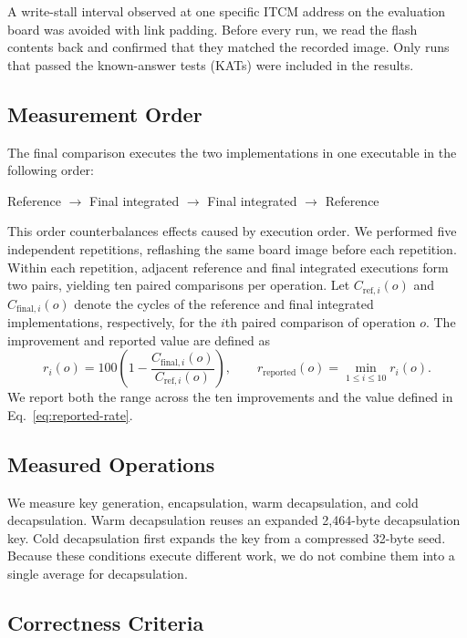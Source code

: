 \documentclass[runningheads,orivec]{llncs}
\begin{document}
A write-stall interval observed at one specific ITCM address on the evaluation
board was avoided with link padding. Before every run, we read the flash contents
back and confirmed that they matched the recorded image. Only runs that passed
the known-answer tests (KATs) were included in the results.

\subsection{Measurement Order}

The final comparison executes the two implementations in one executable in the
following order:
\begin{center}
Reference $\rightarrow$ Final integrated $\rightarrow$ Final integrated
$\rightarrow$ Reference
\end{center}
This order counterbalances effects caused by execution order. We performed five
independent repetitions, reflashing the same board image before each repetition.
Within each repetition, adjacent reference and final integrated executions form
two pairs, yielding ten paired comparisons per operation. Let
$C_{\mathrm{ref},i}(o)$ and $C_{\mathrm{final},i}(o)$ denote the cycles of the
reference and final integrated implementations, respectively, for the $i$th
paired comparison of operation $o$. The improvement and reported value are
defined as
\begin{equation}
r_i(o)=100\left(1-\frac{C_{\mathrm{final},i}(o)}{C_{\mathrm{ref},i}(o)}\right),
\qquad
r_{\mathrm{reported}}(o)=\min_{1\le i\le10}r_i(o).
\label{eq:reported-rate}
\end{equation}
We report both the range across the ten improvements and the value defined in
Eq.~\eqref{eq:reported-rate}.

\subsection{Measured Operations}

We measure key generation, encapsulation, warm decapsulation, and cold
decapsulation. Warm decapsulation reuses an expanded 2,464-byte decapsulation
key. Cold decapsulation first expands the key from a compressed 32-byte seed.
Because these conditions execute different work, we do not combine them into a
single average for decapsulation.

\subsection{Correctness Criteria}
\end{document}
